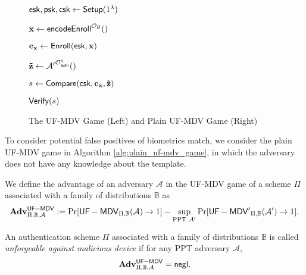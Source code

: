 \begin{figure}[h]
\begin{minipage}[t]{0.45\linewidth}
\begin{algorithm}[H]
\begin{algorithmic}[1]
		\State ${\sf esk}, {\sf psk}, {\sf csk} \gets {\sf Setup}(1^\lambda)$

		\State $\mathbf{x} \gets {\sf encodeEnroll}^{\mathcal{O}_{\mathcal{B}}}()$

		\State $\mathbf{c_x} \gets {\sf Enroll}({\sf esk}, \mathbf{x})$

		\State ${\mathbf{\tilde{z}}} \gets \mathcal{A'}^{\mathcal{O}_{\sf auth}^q}()$

		\State $s \gets {\sf Compare}( {\sf csk}, \mathbf{c_x}, \mathbf{\tilde{z}} )$

		\State \Return ${\sf Verify}(s)$
	\end{algorithmic}
	\end{algorithm}
	\end{minipage}

\caption{The UF-MDV Game (Left) and Plain UF-MDV Game (Right)}
\label{fig:uf-mdv_game}
\end{figure}

To consider potential false positives of biometrics match, we consider the plain UF-MDV game in Algorithm \ref{alg:plain_uf-mdv_game}, in which the adversary does not have any knowledge about the template.

We define the advantage of an adversary $\mathcal{A}$ in the UF-MDV game of a scheme $\Pi$ associated with a family of distributions $\mathbb{B}$ as
\[
	\mathbf{Adv}^{\sf UF-MDV}_{\Pi, \mathbb{B}, \mathcal{A}} := \Pr[{\sf UF-MDV}_{\Pi, \mathbb{B}}(\mathcal{A}) \to 1] -
	\sup_{\text{PPT } \mathcal{A'}} \Pr[{\sf UF-MDV'}_{\Pi, \mathbb{B}}(\mathcal{A'}) \to 1].
\]

An authentication scheme $\Pi$ associated with a family of distributions $\mathbb{B}$ is called \emph{unforgeable against malicious device} if for any PPT adversary $\mathcal{A}$,
\[
	\mathbf{Adv}^{\sf UF-MDV}_{\Pi, \mathbb{B}, \mathcal{A}} = \mathsf{negl}.
\]

% 

\nocite{*}
\printbibliography




